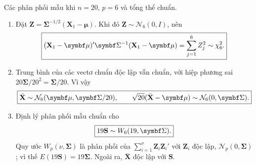 \begin{problem}[Bài 4.19.]
Các phân phối mẫu khi $n=20$, $p=6$ và tổng thể chuẩn.
\end{problem}
\begin{solution}
\begin{enumerate}[label=\textbf{\alph*)}]
\item Đặt $\mathbf Z=\boldsymbol\Sigma^{-1/2}(\mathbf X_1-\boldsymbol\mu)$.
Khi đó $\mathbf Z\sim\mathcal N_6(0,I)$, nên
\[
\answer{(\mathbf X_1-\boldsymbol\mu)'\boldsymbol\Sigma^{-1}
(\mathbf X_1-\boldsymbol\mu)=\sum_{j=1}^6Z_j^2\sim\chi_6^2.}
\]
\item Trung bình của các vectơ chuẩn độc lập vẫn chuẩn, với hiệp phương sai
$20\boldsymbol\Sigma/20^2=\boldsymbol\Sigma/20$. Vì vậy
\[
\answer{\bar{\mathbf X}\sim\mathcal N_6(\boldsymbol\mu,\boldsymbol\Sigma/20),
\qquad\sqrt{20}(\bar{\mathbf X}-\boldsymbol\mu)\sim\mathcal N_6(0,\boldsymbol\Sigma).}
\]
\item Định lý phân phối mẫu chuẩn cho
\[
\answer{19\mathbf S\sim W_6(19,\boldsymbol\Sigma).}
\]
Quy ước $W_p(\nu,\boldsymbol\Sigma)$ là phân phối của
$\sum_{i=1}^{\nu}\mathbf Z_i\mathbf Z_i'$ với $\mathbf Z_i$ độc lập,
$\mathcal N_p(0,\boldsymbol\Sigma)$; vì thế $E(19\mathbf S)=19\boldsymbol\Sigma$.
Ngoài ra, $\bar{\mathbf X}$ độc lập với $\mathbf S$.
\end{enumerate}
\end{solution}

